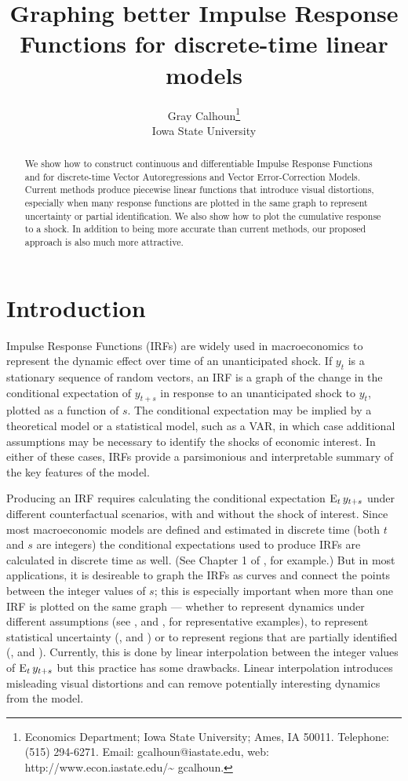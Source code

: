 \documentclass[12pt,fleqn]{article}
\title{Graphing better Impulse Response Functions for discrete-time
  linear models}
\author{Gray Calhoun\thanks{Economics Department; Iowa State
    University; Ames, IA 50011. Telephone: (515) 294-6271.  Email:
    \guillemotleft gcalhoun@iastate.edu\guillemotright, web:
    \guillemotleft http://www.econ.iastate.edu/\textasciitilde
    gcalhoun\guillemotright.} \\
  Iowa State University}
\begin{document}
\maketitle
\begin{abstract}\noindent%
  We show how to construct continuous and differentiable
  Impulse Response Functions and for discrete-time Vector Autoregressions
  and Vector Error-Correction Models. Current methods produce piecewise linear
  functions that introduce visual distortions, especially when many
  response functions are plotted in the same graph to represent
  uncertainty or partial identification. We also show how to plot the
  cumulative response to a shock. In addition to being more accurate
  than current methods, our proposed approach is also much more attractive.
\end{abstract}

\tableofcontents
\newpage

\section{Introduction}
\label{S1}

Impulse Response Functions (IRFs) are widely used in macroeconomics
to represent the dynamic effect over time of an unanticipated
shock. If $y_t$ is a stationary sequence of random vectors, an IRF
is a graph of the change in the conditional expectation of $y_{t+s}$
in response to an unanticipated shock to $y_t$, plotted as a function
of $s$. The conditional expectation may be implied by a theoretical
model or a statistical model, such as a VAR, in which case additional
assumptions may be necessary to identify the shocks of economic
interest. In either of these cases, IRFs provide a parsimonious and
interpretable summary of the key features of the model.

Producing an IRF requires calculating the conditional expectation
$\operatorname{E}_t y_{t+s}$ under different counterfactual scenarios, with and
without the shock of interest. Since most macroeconomic models are
defined and estimated in discrete time (both $t$ and $s$ are integers)
the conditional expectations used to produce IRFs are calculated in
discrete time as well. (See Chapter 1 of \citealp{Ham:94}, for
example.) But in most applications, it is desireable to graph the IRFs
as curves and connect the points between the integer values of $s$;
this is especially important when more than one IRF is plotted on
the same graph --- whether to represent dynamics under different
assumptions (see \citealp{BeM:98}, and \citealp{StW:01}, for
representative examples), to represent statistical uncertainty
(\citealp{Kil:98}, and \citealp{SiZ:99}) or to represent regions that
are partially identified (\citealp{Uhl:05}, and
\citealp{InK:13}). Currently, this is done by linear interpolation
between the integer values of $\operatorname{E}_t y_{t+s}$ but this practice has
some drawbacks. Linear interpolation introduces misleading visual
distortions and can remove potentially interesting dynamics from the
model.
\end{document}
